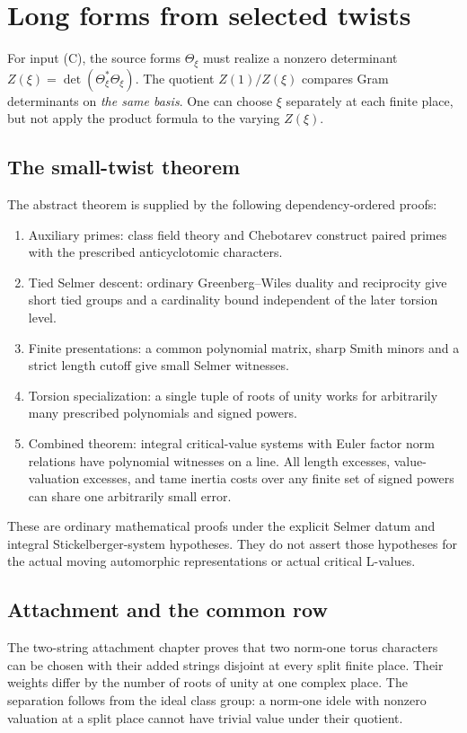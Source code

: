 \section{Long forms from selected twists}
For input (C), the source forms \(\Theta_\xi\) must realize a
nonzero determinant \(Z(\xi)=\det(\Theta_\xi^*\Theta_\xi)\).
The quotient \(Z(1)/Z(\xi)\) compares Gram determinants on
\emph{the same basis}. One can choose \(\xi\) separately at
each finite place, but not apply the product formula to the
varying \(Z(\xi)\).

\subsection{The small-twist theorem}
The abstract theorem is supplied by the following
dependency-ordered proofs:
\begin{enumerate}
\item {}
{Auxiliary primes}: class field theory and Chebotarev construct
paired primes with the prescribed anticyclotomic characters.
\item {}
{Tied Selmer descent}: ordinary Greenberg--Wiles duality and
reciprocity give short tied groups and a cardinality bound
independent of the later torsion level.
\item {}
{Finite presentations}: a common polynomial matrix, sharp
Smith minors and a strict length cutoff give small Selmer witnesses.
\item {}
{Torsion specialization}: a single tuple of roots of unity
works for arbitrarily many prescribed polynomials and signed powers.
\item {}
{Combined theorem}: integral critical-value systems with Euler
factor norm relations have polynomial witnesses on a line.
All length excesses, value-valuation excesses, and tame inertia
costs over any finite set of signed powers can share one arbitrarily
small error.
\end{enumerate}
These are ordinary mathematical proofs under the explicit
Selmer datum and integral Stickelberger-system hypotheses.
They do not assert those hypotheses for the actual moving
automorphic representations or actual critical L-values.

\subsection{Attachment and the common row}
The 
{two-string attachment chapter} proves that two
norm-one torus characters can be chosen with their added
strings disjoint at every split finite place. Their weights
differ by the number of roots of unity at one complex place.
The separation follows from the ideal class group: a
norm-one idele with nonzero valuation at a split place
cannot have trivial value under their quotient.

